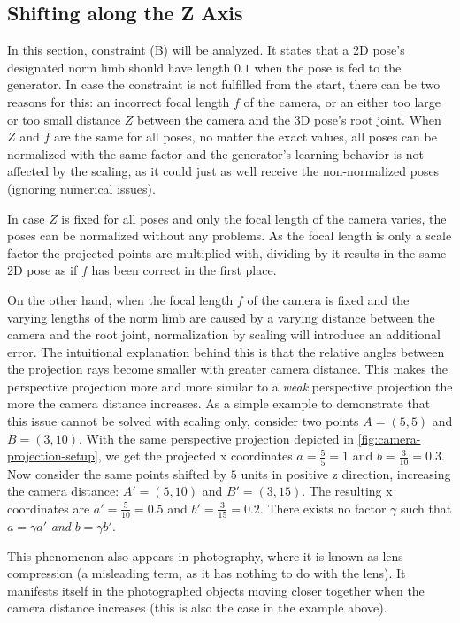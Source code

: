 	
\subsection{Shifting along the Z Axis}
\label{sec:z-shift-error}

In this section, constraint (B) will be analyzed.
It states that a 2D pose's designated norm limb should have length $0.1$ when the pose is fed to the generator.
In case the constraint is not fulfilled from the start, there can be two reasons for this: 
an incorrect focal length $f$ of the camera, or an either too large or too small distance $Z$ between the camera and the 3D pose's root joint.
When $Z$ and $f$ are the same for all poses, no matter the exact values, all poses can be normalized with the same factor and the generator's learning behavior is not affected by the scaling, as it could just as well receive the non-normalized poses (ignoring numerical issues).

In case $Z$ is fixed for all poses and only the focal length of the camera varies, the poses can be normalized without any problems.
As the focal length is only a scale factor the projected points are multiplied with, dividing by it results in the same 2D pose as if $f$ has been correct in the first place.

On the other hand, when the focal length $f$ of the camera is fixed and the varying lengths of the norm limb are caused by a varying distance between the camera and the root joint, normalization by scaling will introduce an additional error.
The intuitional explanation behind this is that the relative angles between the projection rays become smaller with greater camera distance.
This makes the perspective projection more and more similar to a \emph{weak} perspective projection the more the camera distance increases.
As a simple example to demonstrate that this issue cannot be solved with scaling only, consider two points $A = (5, 5)$ and $B = (3, 10)$. 
With the same perspective projection depicted in \autoref{fig:camera-projection-setup}, we get the projected x coordinates $a = \frac{5}{5} = 1$ and $b = \frac{3}{10} = 0.3$.
Now consider the same points shifted by $5$ units in positive z direction, increasing the camera distance: $A' = (5, 10)$ and $B' = (3, 15)$.
The resulting x coordinates are $a' = \frac{5}{10} = 0.5$ and $b' = \frac{3}{15} = 0.2$.
There exists no factor $\gamma$ such that $a = \gamma a'$ \emph{and} $b = \gamma b'$.

This phenomenon also appears in photography, where it is known as lens compression (a misleading term, as it has nothing to do with the lens).
It manifests itself in the photographed objects moving closer together when the camera distance increases (this is also the case in the example above).

